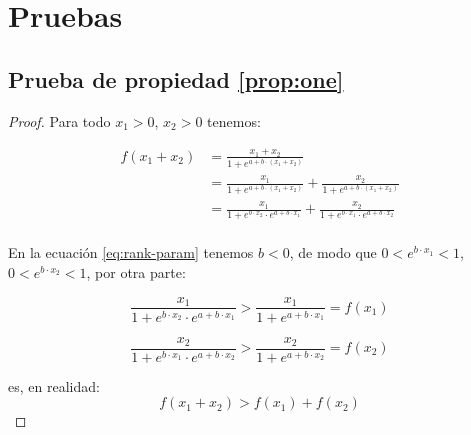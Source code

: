 \section{Pruebas}
\label{sec:appendix_proof}
\subsection{Prueba de propiedad \ref{prop:one}}
\begin{proof}
\label{proof:one}
Para todo $x_1>0$, $x_2>0$ tenemos:

\[
\begin{aligned}
f(x_1+x_2)&=\frac{x_1+x_2}{1+e^{a+b\cdot (x_1+x_2)}}\\
&=\frac{x_1}{1+e^{a+b\cdot (x_1+x_2)}}+\frac{x_2}{1+e^{a+b\cdot (x_1+x_2)}}\\
&=\frac{x_1}{1+e^{b\cdot x_2}\cdot e^{a+b\cdot {x_1}}}+\frac{x_2}{1+e^{b\cdot x_1}\cdot e^{a+b\cdot {x_2}}}\\
\end{aligned}
\]

En la ecuación \ref{eq:rank-param} tenemos $b<0$, de modo que $0<e^{b\cdot x_1}<1$, $0<e^{b\cdot x_2}<1$, por otra parte:

\[
\frac{x_1}{1+e^{b\cdot x_2}\cdot e^{a+b\cdot {x_1}}}>\frac{x_1}{1+ e^{a+b\cdot {x_1}}}=f(x_1)
\]

\[
\frac{x_2}{1+e^{b\cdot x_1}\cdot e^{a+b\cdot {x_2}}}>\frac{x_2}{1+ e^{a+b\cdot {x_2}}}=f(x_2)
\]

es, en realidad:
\[
f(x_1+x_2)>f(x_1)+f(x_2)
\]
\end{proof}


